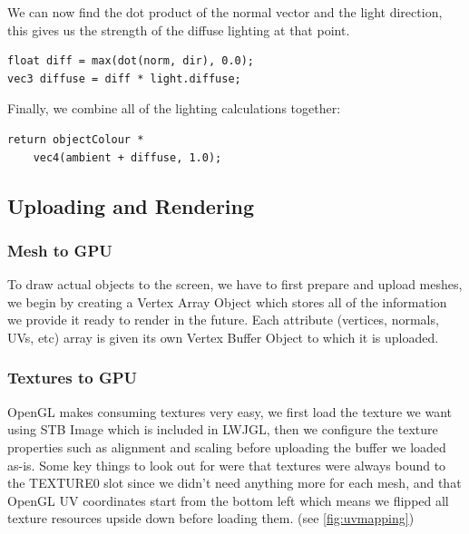 \documentclass{article}
\begin{document}
\begin{multicols}{2}
                    We can now find the dot product of the normal vector and the light direction, this gives us the strength of the diffuse lighting at that point.

                    \begin{lstlisting}
float diff = max(dot(norm, dir), 0.0);
vec3 diffuse = diff * light.diffuse;\end{lstlisting}

                    Finally, we combine all of the lighting calculations together:

                    \begin{lstlisting}
return objectColour *
    vec4(ambient + diffuse, 1.0);\end{lstlisting}

            \subsection{Uploading and Rendering}
            
                \subsubsection{Mesh to GPU}
            
                    To draw actual objects to the screen, we have to first prepare and upload meshes, we begin by creating a Vertex Array Object \cite{vao} which stores all of the information we provide it ready to render in the future. Each attribute (vertices, normals, UVs, etc) array is given its own Vertex Buffer Object \cite{vbo} to which it is uploaded.
                
                \subsubsection{Textures to GPU}
                
                    OpenGL makes consuming textures very easy, we first load the texture we want using STB Image \cite{stb} which is included in LWJGL, then we configure the texture properties such as alignment and scaling before uploading the buffer we loaded as-is. Some key things to look out for were that textures were always bound to the TEXTURE0 slot since we didn’t need anything more for each mesh, and that OpenGL UV coordinates start from the bottom left which means we flipped all texture resources upside down before loading them. (see \autoref{fig:uvmapping})
            

\end{multicols}
\end{document}
